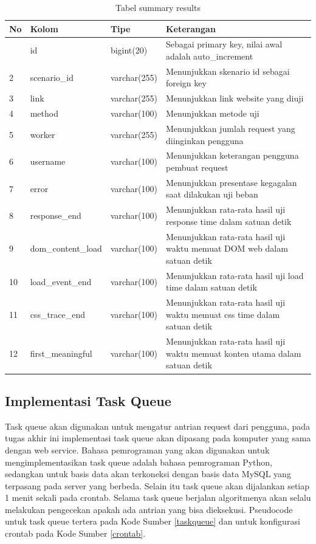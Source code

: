 				\begin{longtable}{|p{}|p{}|p{}|p{}|}
					\caption{Tabel summary results} \label{tabelsumresults} \\
					\hline
					\textbf{No} & \textbf{Kolom} & \textbf{Tipe} & \textbf{Keterangan} \\ \hline
					\endhead
					\endfoot
					\endlastfoot
					1 & id & bigint(20) & Sebagai primary key, nilai awal adalah auto\_increment \\ \hline
					2 & scenario\_id & varchar(255) & Menunjukkan skenario id sebagai foreign key \\ \hline
					3 & link & varchar(255) & Menunjukkan link website yang diuji \\ \hline
					4 & method & varchar(100) & Menunjukkan metode uji \\ \hline
					5 & worker & varchar(255) & Menunjukkan jumlah request yang diinginkan pengguna \\ \hline
					6 & username & varchar(100) & Menunjukkan keterangan pengguna pembuat request \\ \hline
					7 & error & varchar(100) & Menunjukkan presentase kegagalan saat dilakukan uji beban \\ \hline
					8 & response\_end & varchar(100) & Menunjukkan rata-rata hasil uji response time dalam satuan detik \\ \hline
					9 & dom\_content\_load & varchar(100) & Menunjukkan rata-rata hasil uji waktu memuat DOM web dalam satuan detik \\ \hline
					10 & load\_event\_end & varchar(100) & Menunjukkan rata-rata hasil uji load time dalam satuan detik \\ \hline
					11 & css\_trace\_end & varchar(100) & Menunjukkan rata-rata hasil uji waktu memuat css time dalam satuan detik \\ \hline
					12 & first\_meaningful & varchar(100) & Menunjukkan rata-rata hasil uji waktu memuat konten utama dalam satuan detik \\ \hline
				\end{longtable}
			
		\subsection{Implementasi Task Queue}
			Task queue akan digunakan untuk mengatur antrian request dari pengguna, pada tugas akhir ini implementasi task queue akan dipasang pada komputer yang sama dengan web service. Bahasa pemrograman yang akan digunakan untuk mengimplementasikan task queue adalah bahasa pemrograman Python, sedangkan untuk basis data akan terkoneksi dengan basis data MySQL yang terpasang pada server yang berbeda. Selain itu task queue akan dijalankan setiap 1 menit sekali pada crontab. Selama task queue berjalan algoritmenya akan selalu melakukan pengecekan apakah ada antrian yang bisa dieksekusi. Pseudocode untuk task queue tertera pada Kode Sumber \ref{taskqueue} dan untuk konfigurasi crontab pada Kode Sumber \ref{crontab}.
			

